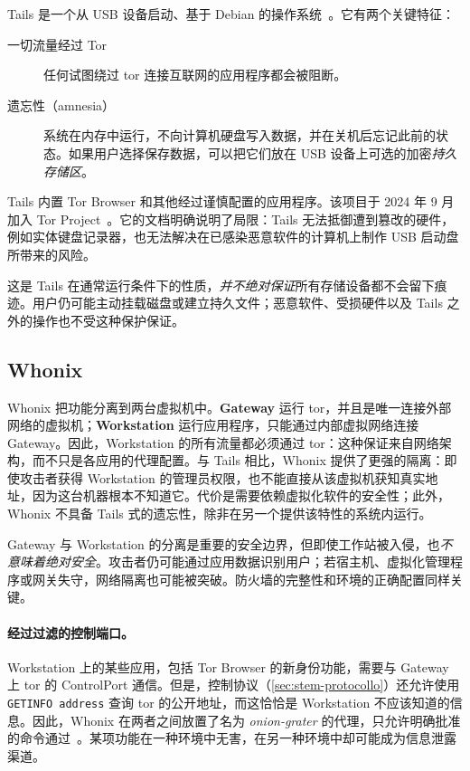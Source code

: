 Tails 是一个从 USB 设备启动、基于 Debian 的操作系统~\cite{tailsabout}。它有两个关键特征：
\begin{description}
  \item[一切流量经过 Tor] 任何试图绕过 tor 连接互联网的应用程序都会被阻断。
  \item[遗忘性（amnesia）] 系统在内存中运行，不向计算机硬盘写入数据，并在关机后忘记此前的状态。如果用户选择保存数据，可以把它们放在 USB 设备上可选的加密\emph{持久存储区}。
\end{description}
Tails 内置 Tor Browser 和其他经过谨慎配置的应用程序。该项目于 2024 年 9 月加入 Tor Project~\cite{torblogtails}。它的文档明确说明了局限：Tails 无法抵御遭到篡改的硬件，例如实体键盘记录器，也无法解决在已感染恶意软件的计算机上制作 USB 启动盘所带来的风险。

这是 Tails 在通常运行条件下的性质，\emph{并不绝对保证}所有存储设备都不会留下痕迹。用户仍可能主动挂载磁盘或建立持久文件；恶意软件、受损硬件以及 Tails 之外的操作也不受这种保护保证。

\subsection{Whonix}

Whonix 把功能分离到两台虚拟机中。\textbf{Gateway} 运行 tor，并且是唯一连接外部网络的虚拟机；\textbf{Workstation} 运行应用程序，只能通过内部虚拟网络连接 Gateway。因此，Workstation 的所有流量都必须通过 tor：这种保证来自网络架构，而不只是各应用的代理配置。与 Tails 相比，Whonix 提供了更强的隔离：即使攻击者获得 Workstation 的管理员权限，也不能直接从该虚拟机获知真实地址，因为这台机器根本不知道它。代价是需要依赖虚拟化软件的安全性；此外，Whonix 不具备 Tails 式的遗忘性，除非在另一个提供该特性的系统内运行。

Gateway 与 Workstation 的分离是重要的安全边界，但即使工作站被入侵，也\emph{不意味着绝对安全}。攻击者仍可能通过应用数据识别用户；若宿主机、虚拟化管理程序或网关失守，网络隔离也可能被突破。防火墙的完整性和环境的正确配置同样关键。

\paragraph{经过过滤的控制端口。} Workstation 上的某些应用，包括 Tor Browser 的新身份功能，需要与 Gateway 上 tor 的 ControlPort 通信。但是，控制协议（\cref{sec:stem-protocollo}）还允许使用 \texttt{GETINFO address} 查询 tor 的公开地址，而这恰恰是 Workstation 不应该知道的信息。因此，Whonix 在两者之间放置了名为 \emph{onion-grater} 的代理，只允许明确批准的命令通过~\cite{whonixgrater}。某项功能在一种环境中无害，在另一种环境中却可能成为信息泄露渠道。

